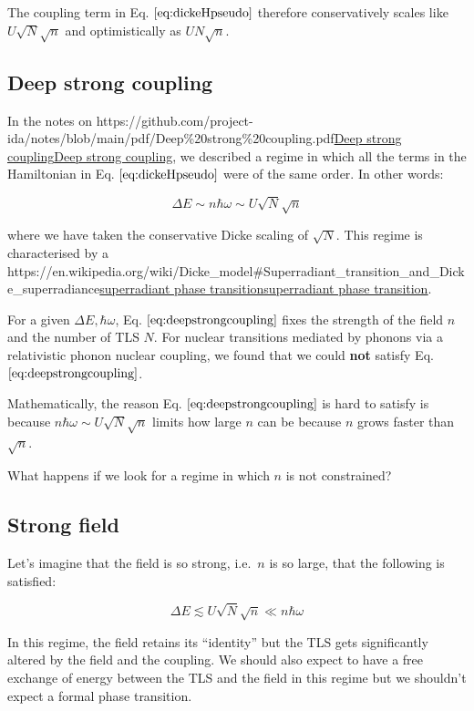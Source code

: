 \documentclass[
]{article}
\let\oldhref\href
\renewcommand{\href}[2]{\ifx#1\urlprefix\oldhref{#1}{#2}\else\uline{\oldhref{#1}{#2}}\fi}
\renewcommand{\[}{\begin{equation}}
\renewcommand{\]}{\end{equation}}
\begin{document}
The coupling term in Eq. \(\ref{eq:dickeHpseudo}\) therefore
conservatively scales like \(U\sqrt{N}\sqrt{n}\) and optimistically as
\(UN\sqrt{n}\).

\subsection{Deep strong coupling}\label{deep-strong-coupling}

In the notes on
\href{https://github.com/project-ida/notes/blob/main/pdf/Deep\%20strong\%20coupling.pdf}{Deep
strong coupling}, we described a regime in which all the terms in the
Hamiltonian in Eq. \(\ref{eq:dickeHpseudo}\) were of the same order. In
other words:

\[
\Delta E \sim n\hbar\omega \sim U\sqrt{N}\sqrt{n}
\label{eq:deepstrongcoupling}
\]

where we have taken the conservative Dicke scaling of \(\sqrt{N}\). This
regime is characterised by a
\href{https://en.wikipedia.org/wiki/Dicke_model\#Superradiant_transition_and_Dicke_superradiance}{superradiant
phase transition}.

For a given \(\Delta E, \hbar\omega\), Eq.
\(\ref{eq:deepstrongcoupling}\) fixes the strength of the field \(n\)
and the number of TLS \(N\). For nuclear transitions mediated by phonons
via a relativistic phonon nuclear coupling, we found that we could
\textbf{not} satisfy Eq. \(\ref{eq:deepstrongcoupling}\).

Mathematically, the reason Eq. \(\ref{eq:deepstrongcoupling}\) is hard
to satisfy is because \(n\hbar\omega \sim U\sqrt{N}\sqrt{n}\) limits how
large \(n\) can be because \(n\) grows faster than \(\sqrt{n}\).

What happens if we look for a regime in which \(n\) is not constrained?

\subsection{Strong field}\label{strong-field}

Let's imagine that the field is so strong, i.e.~\(n\) is so large, that
the following is satisfied:

\[
\Delta E \lesssim U\sqrt{N}\sqrt{n} \ll n\hbar \omega
\label{eq:strongfield}
\]

In this regime, the field retains its ``identity'' but the TLS gets
significantly altered by the field and the coupling. We should also
expect to have a free exchange of energy between the TLS and the field
in this regime but we shouldn't expect a formal phase transition.
\end{document}
